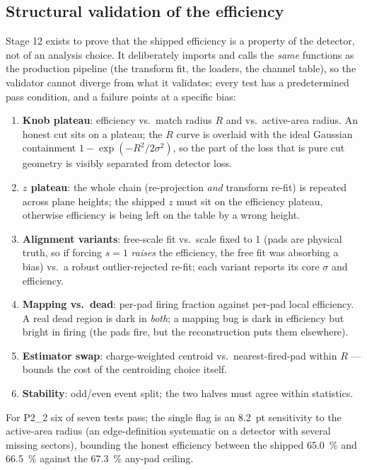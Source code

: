 \documentclass[11pt,a4paper]{article}
\newcommand{\dettwo}{P2\_2}
\begin{document}
\subsection{Structural validation of the efficiency}
\label{sec:validation}

Stage 12 exists to prove that the shipped efficiency is a property of the
detector, not of an analysis choice. It deliberately imports and calls the
\emph{same} functions as the production pipeline (the transform fit, the
loaders, the channel table), so the validator cannot diverge from what it
validates; every test has a predetermined pass condition, and a failure
points at a specific bias:

\begin{enumerate}[itemsep=2pt]
  \item \textbf{Knob plateau}: efficiency vs.\ match radius $R$ and vs.\
        active-area radius. An honest cut sits on a plateau; the $R$ curve is
        overlaid with the ideal Gaussian containment
        $1-\exp(-R^2/2\sigma^2)$, so the part of the loss that is pure cut
        geometry is visibly separated from detector loss.
  \item \textbf{$z$ plateau}: the whole chain (re-projection \emph{and}
        transform re-fit) is repeated across plane heights; the shipped $z$
        must sit on the efficiency plateau, otherwise efficiency is being
        left on the table by a wrong height.
  \item \textbf{Alignment variants}: free-scale fit vs.\ scale fixed to 1
        (pads are physical truth, so if forcing $s=1$ \emph{raises} the
        efficiency, the free fit was absorbing a bias) vs.\ a robust
        outlier-rejected re-fit; each variant reports its core $\sigma$ and
        efficiency.
  \item \textbf{Mapping vs.\ dead}: per-pad firing fraction against per-pad
        local efficiency. A real dead region is dark in \emph{both}; a
        mapping bug is dark in efficiency but bright in firing (the pads
        fire, but the reconstruction puts them elsewhere).
  \item \textbf{Estimator swap}: charge-weighted centroid vs.\
        nearest-fired-pad within $R$ --- bounds the cost of the centroiding
        choice itself.
  \item \textbf{Stability}: odd/even event split; the two halves must agree
        within statistics.
\end{enumerate}

For \dettwo{} six of seven tests pass; the single flag is an
\SI{8.2}{pt} sensitivity to the active-area radius (an edge-definition
systematic on a detector with several missing sectors), bounding the honest
efficiency between the shipped \SI{65.0}{\percent} and \SI{66.5}{\percent}
against the \SI{67.3}{\percent} any-pad ceiling.
\end{document}
